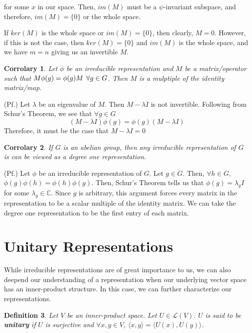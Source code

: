 \documentclass[10pt]{ucthesis}
\newcommand{\C}{\mathbb{C}}
\newtheorem{definition}{Definition}[chapter]
\newtheorem{corrolary}[definition]{Corrolary}
\begin{document}
for some $x$ in our space. Then, $im(M)$ must be a $\psi$-invariant subspace, and therefore, $im(M) = \{0\}$ or the whole space.

If $ker(M)$ is the whole space or $im(M) = \{0\}$, then clearly, $M=0$. However, if this is not the case, then $ker(M) = \{0\}$ and $im(M)$ is the whole space, and we have $m=n$ giving us an invertible $M$. \qedsymbol

\begin{corrolary}
	Let $\phi$ be an irreducible representation and $M$ be a matrix/operator such that $M\phi(g)=\phi(g)M \hspace{1.5mm}\forall g \in G$. Then $M$ is a mulptiple of the identity matrix/map.
\end{corrolary}

\noindent (Pf.) Let $\lambda$ be an eigenvalue of $M$. Then $M - \lambda I$ is not invertible. Following from Schur's Theorem, we see that $\forall g \in G$
$$(M-\lambda I)\phi(g) = \phi(g) (M-\lambda I)$$
Therefore, it must be the case that $M-\lambda I = 0$ \cite{Mendes} \qedsymbol 

\begin{corrolary}
	If $G$ is an abelian group, then any irreducible representation of $G$ is can be viewed as a degree one representation.
\end{corrolary}

\noindent(Pf.) Let $\phi$ be an irreducible representation of $G$. Let $g \in G$. Then, $\forall h \in G$, $\phi(g)\phi(h) = \phi(h)\phi(g)$. Then, Schur's Theorem tells us that $\phi(g) = \lambda_g I$ for some $\lambda_g \in \C$. Since $g$ is arbitrary, this argument forces every matrix in the representation to be a scalar multiple of the identity matrix. We can take the degree one representation to be the first entry of each matrix. \cite{Tung} \qedsymbol

\section{Unitary Representations}

While irreducible representations are of great importance to us, we can also deepend our understanding of a representation when our underlying vector space has an inner-product structure. In this case, we can further characterize our representations. 

\begin{definition}
	Let $V$ be an inner-product space. Let $U \in \mathcal{L}(V)$. $U$ is said to be \textbf{unitary} if $U$ is surjective and $\forall x,y \in V$, $\langle x , y \rangle = \langle U(x) , U(y) \rangle$.
\end{definition}
\end{document}
